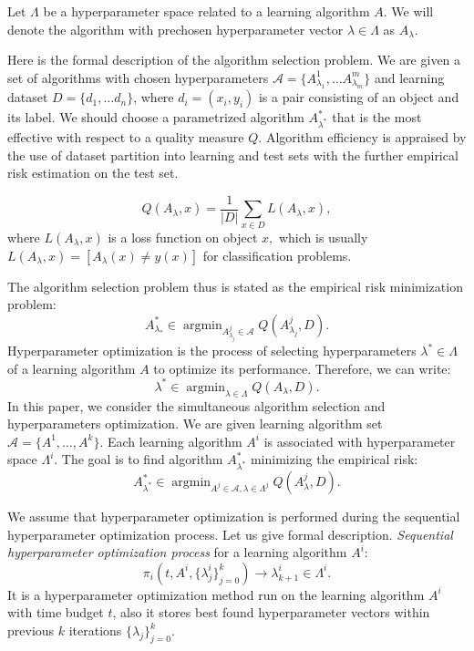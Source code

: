 \documentclass{svproc}
\DeclareMathOperator*{\argmin}{argmin}
\begin{document}
Let $\Lambda$ be a hyperparameter space related to a learning algorithm $A$. We will denote the algorithm with prechosen hyperparameter vector $\lambda \in \Lambda$ as $A_{\lambda}$.

Here is the formal description of the algorithm selection problem. We are given a set of algorithms with chosen hyperparameters $\mathcal{A} = \{A^1_{\lambda_1}, \dots A^m_{\lambda_m}\}$ and learning dataset $D = \{d_1, \dots d_n\}$, where $d_i = (x_i, y_i)$ is a pair consisting of an object and its label. We should choose a parametrized algorithm  $A^*_{\lambda^*}$ that is the most effective with respect to a quality measure $Q$. Algorithm efficiency is appraised by the use of dataset partition into learning and test sets with the further empirical risk estimation on the test set. 

\[
Q(A_{\lambda}, x) = \frac {1} {|D|} \sum_{x \in D} L(A_{\lambda}, x),
\]
where $L(A_{\lambda}, x)$ is a loss function on object $x,$ which is usually $L(A_{\lambda}, x) = [A_{\lambda}(x) \neq y(x)]$
for classification problems.

The algorithm selection problem thus is stated as the empirical risk minimization problem:
\[
A^*_{\lambda_*} \in \argmin_{A^j_{\lambda_j} \in \mathcal{A}} Q(A^j_{\lambda_j}, D).
\]
Hyperparameter optimization is the process of selecting hyperparameters $\lambda^* \in \Lambda$ of a learning algorithm $A$ to optimize its performance. Therefore, we can write:
\[
\lambda^* \in \argmin_{\lambda \in \Lambda} Q(A_{\lambda}, D).
\]
In this paper, we consider the simultaneous algorithm selection and hyperparameters optimization. We are given learning algorithm set $\mathscr{A}=\{A^1, \dots , A^k\}.$ Each learning algorithm $A^i$ is associated with hyperparameter space $\Lambda^i$. The goal is to find algorithm $A^*_{\lambda^*}$ minimizing the empirical risk:
\[
A^*_{\lambda^*} \in \argmin_{A^j \in \mathscr{A}, \lambda \in \Lambda^j} Q(A_{\lambda}^j, D).
\]

We assume that hyperparameter optimization is performed during the sequential hyperparameter optimization process. Let us give formal description. \emph{Sequential hyperparameter optimization process} for a learning algorithm $A^i$: 
\[
\pi_i(t, A^i, \{\lambda^i_j\}^k_{j=0}) \rightarrow \lambda^i_{k+1} \in \Lambda^i.
\]
It is a hyperparameter optimization method run on the learning algorithm $A^i$ with time budget $t$, also it stores best found hyperparameter vectors within previous $k$ iterations $\{\lambda_j\}^k_{j=0}$. 
\end{document}
